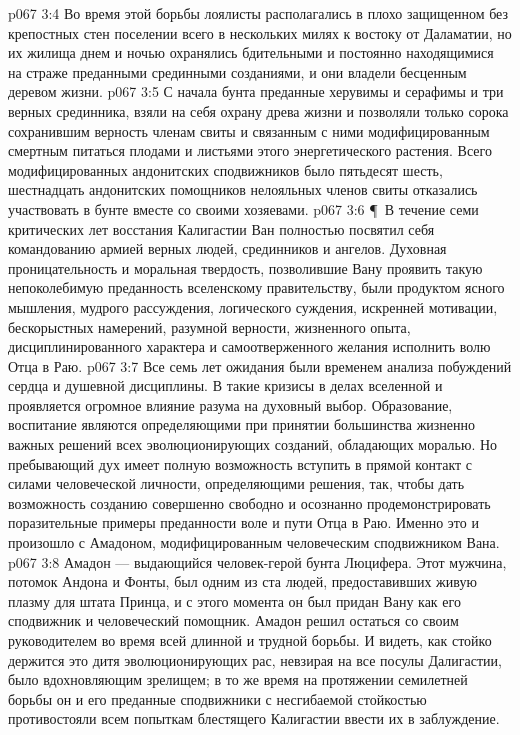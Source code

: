 \vs p067 3:4 Во время этой борьбы лоялисты располагались в плохо защищенном без крепостных стен поселении всего в нескольких милях к востоку от Даламатии, но их жилища днем и ночью охранялись бдительными и постоянно находящимися на страже преданными срединными созданиями, и они владели бесценным деревом жизни.
\vs p067 3:5 С начала бунта преданные херувимы и серафимы и три верных срединника, взяли на себя охрану древа жизни и позволяли только сорока сохранившим верность членам свиты и связанным с ними модифицированным смертным питаться плодами и листьями этого энергетического растения. Всего модифицированных андонитских сподвижников было пятьдесят шесть, шестнадцать андонитских помощников нелояльных членов свиты отказались участвовать в бунте вместе со своими хозяевами.
\vs p067 3:6 \P\ В течение семи критических лет восстания Калигастии Ван полностью посвятил себя командованию армией верных людей, срединников и ангелов. Духовная проницательность и моральная твердость, позволившие Вану проявить такую непоколебимую преданность вселенскому правительству, были продуктом ясного мышления, мудрого рассуждения, логического суждения, искренней мотивации, бескорыстных намерений, разумной верности, жизненного опыта, дисциплинированного характера и самоотверженного желания исполнить волю Отца в Раю.
\vs p067 3:7 Все семь лет ожидания были временем анализа побуждений сердца и душевной дисциплины. В такие кризисы в делах вселенной и проявляется огромное влияние разума на духовный выбор. Образование, воспитание являются определяющими при принятии большинства жизненно важных решений всех эволюционирующих созданий, обладающих моралью. Но пребывающий дух имеет полную возможность вступить в прямой контакт с силами человеческой личности, определяющими решения, так, чтобы дать возможность созданию совершенно свободно и осознанно продемонстрировать поразительные примеры преданности воле и пути Отца в Раю. Именно это и произошло с Амадоном, модифицированным человеческим сподвижником Вана.
\vs p067 3:8 Амадон --- выдающийся человек\hyp{}герой бунта Люцифера. Этот мужчина, потомок Андона и Фонты, был одним из ста людей, предоставивших живую плазму для штата Принца, и с этого момента он был придан Вану как его сподвижник и человеческий помощник. Амадон решил остаться со своим руководителем во время всей длинной и трудной борьбы. И видеть, как стойко держится это дитя эволюционирующих рас, невзирая на все посулы Далигастии, было вдохновляющим зрелищем; в то же время на протяжении семилетней борьбы он и его преданные сподвижники с несгибаемой стойкостью противостояли всем попыткам блестящего Калигастии ввести их в заблуждение.
